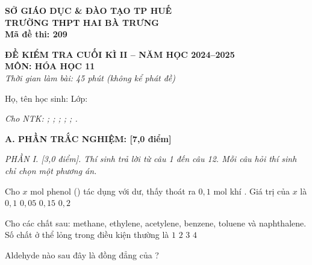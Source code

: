 \documentclass[12pt,a4paper]{article}
\begin{document}
\thispagestyle{firstpage}

\noindent
\begin{minipage}[t]{0.40\textwidth}
	\centering\fontsize{9.5pt}{12pt}\selectfont
	\textbf{SỞ GIÁO DỤC \& ĐÀO TẠO TP HUẾ}\\
	\textbf{TRƯỜNG THPT HAI BÀ TRƯNG}\\
	\textbf{Mã đề thi: 209}
\end{minipage}\hfill
\begin{minipage}[t]{0.58\textwidth}
	\centering\small
	\textbf{ĐỀ KIỂM TRA CUỐI KÌ II -- NĂM HỌC 2024--2025}\\
	\textbf{MÔN: HÓA HỌC 11}\\
	\textit{Thời gian làm bài: 45 phút (không kể phát đề)}
\end{minipage}

\smallskip
\noindent
Họ, tên học sinh: \dotfill Lớp: \makebox[4cm]{\dotfill}

\smallskip
\noindent
\textit{Cho NTK: ; ; ; ; ; .}

\smallskip
\noindent
\textbf{A. PHẦN TRẮC NGHIỆM: [7,0 điểm]}

\begin{flushleft}
	\color{blue!50!green}
\end{flushleft}
\setcounter{ex}{0}
\setcounter{bt}{0}

\textit{PHẦN I. [3,0 điểm]. Thí sinh trả lời từ câu 1 đến câu 12. Mỗi câu hỏi thí sinh chỉ chọn một phương án.}

\begin{ex}
Cho $x\text{ mol}$ phenol () tác dụng với  dư, thấy thoát ra $0{,}1\text{ mol}$ khí . Giá trị của $x$ là
\choice
{$0{,}1$}
{$0{,}05$}
{$0{,}15$}
{\True $0{,}2$}
\loigiai{}
\end{ex}

\begin{ex}
Cho các chất sau: methane, ethylene, acetylene, benzene, toluene và naphthalene. Số chất ở thể lỏng trong điều kiện thường là
\choice
{$1$}
{\True $2$}
{$3$}
{$4$}
\loigiai{}
\end{ex}

\begin{ex}
Aldehyde nào sau đây là đồng đẳng của ?
\choice
{}
{}
{}
{\True {}}
\loigiai{}
\end{ex}
\end{document}
